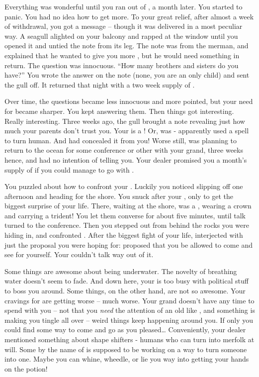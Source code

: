 \documentclass[char]{NeptuneBall}
\begin{document}
Everything was wonderful until you ran out of \iDrug{\MYname}, a month later. You started to panic. You had no idea how to get more. To your great relief, after almost a week of withdrawal, you got a message -- though it was delivered in a most peculiar way. A seagull alighted on your balcony and rapped at the window until you opened it and untied the note from its leg. The note was from the merman, and explained that he wanted to give you more \iDrug{\MYname}, but he would need something in return.  The question was innocuous. ``How many brothers and sisters do you have?'' You wrote the answer on the note (none, you are an only child) and sent the gull off. It returned that night with a two week supply of \iDrug{\MYname}.

Over time, the questions became less innocuous and more pointed, but your need for \iDrug{\MYname} became sharper. You kept answering them. Then things got interesting. Really interesting. Three weeks ago, the gull brought a note revealing just how much your parents don't trust you. Your \cAriel{\parent} \cAriel{} is a \cAriel{\mer}! Or, was - apparently \cAriel{\they} used a spell to turn \cAriel{\themself} human. And \cAriel{\they} had concealed it from you! Worse still, \cAriel{} was planning to return to the ocean for some conference or other with your grand\cKing{\parent}, three weeks hence, and had no intention of telling you. Your dealer promised you a month's supply of \iDrug{\MYname} if you could manage to go with \cAriel{\them}.

You puzzled about how to confront your \cAriel{\parent}. Luckily you noticed \cAriel{\them} slipping off one afternoon and heading for the shore. You snuck after your \cAriel{\parent}, only to get the biggest surprise of your life. There, waiting at the shore, was a \cKing{\mer}, wearing a crown and carrying a trident! You let them converse for about five minutes, until talk turned to the conference. Then you stepped out from behind the rocks you were hiding in, and confronted \cAriel{}. After the biggest fight of your life, \cKing{} interjected with just the proposal you were hoping for: \cKing{\they} proposed that you be allowed to come and see \pAtlantis{} for yourself. Your \cAriel{\parent} couldn't talk \cAriel{\their} way out of it.

Some things are awesome about being underwater. The novelty of breathing water doesn't seem to fade. And down here, your \cAriel{\parent} is too busy with political stuff to boss you around. Some things, on the other hand, are not so awesome. Your cravings for \iDrug{\MYname} are getting worse -- much worse. Your grand\cKing{\parent} doesn't have any time to spend with you -- not that you \emph{need} the attention of an old \cKing{\mer} like \cKing{\them}, and something is making you tingle all over -- weird things keep happening around you. If only you could find some way to come and go as you pleased\ldots{} Conveniently, your dealer mentioned something about shape shifters - humans who can turn into merfolk at will. Some \cManta{\mer} by the name of \cManta{} is supposed to be working on a way to turn someone into one. Maybe you can whine, wheedle, or lie you way into getting your hands on the potion!
\end{document}

